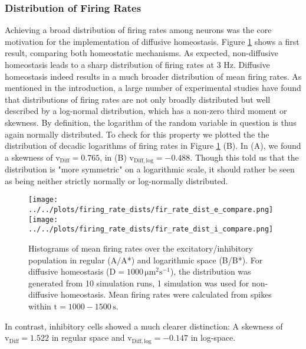 \documentclass[10pt,a4paper]{article}
\begin{document}
\subsubsection{Distribution of Firing Rates}\label{Fir_Dist_Section}
Achieving a broad distribution of firing rates among neurons was the core motivation for the implementation of diffusive homeostasis. Figure \ref{Fir_Rate_Dist_Compare} shows a first result, comparing both homeostatic mechanisms. As expected, non-diffusive homeostasis leads to a sharp distribution of firing rates at 3 Hz. Diffusive homeostasis indeed results in a much broader distribution of mean firing rates. As mentioned in the introduction, a large number of experimental studies have found that distributions of firing rates are not only broadly distributed but well described by a log-normal distribution, which has a non-zero third moment or skewness. By definition, the logarithm of the random variable in question is thus again normally distributed. To check for this property we plotted the the distribution of decadic logarithms of firing rates in Figure \ref{Fir_Rate_Dist_Compare} (B). In (A), we found a skewness of $\mathrm{v_{Diff} = 0.765}$, in (B) $\mathrm{v_{Diff,log} = -0.488}$. Though this told us that the distribution is "more symmetric" on a logarithmic scale, it should rather be seen as being neither strictly normally or log-normally distributed.  
\begin{figure}
\texttt{[image: ../../plots/firing\_rate\_dists/fir\_rate\_dist\_e\_compare.png]}
\texttt{[image: ../../plots/firing\_rate\_dists/fir\_rate\_dist\_i\_compare.png]}
\caption{Histograms of mean firing rates over the excitatory/inhibitory population in regular (A/A*) and logarithmic space (B/B*). For diffusive homeostasis ($\mathrm{D=1000\, \mu m^2 s^{-1}}$), the distribution was generated from 10 simulation runs, 1 simulation was used for non-diffusive homeostasis. Mean firing rates were calculated from spikes within $\mathrm{t=1000-1500\,s}$.}
\label{Fir_Rate_Dist_Compare}
\end{figure}
In contrast, inhibitory cells showed a much clearer distinction: A skewness of $\mathrm{v_{Diff} = 1.522}$ in regular space and $\mathrm{v_{Diff,log} = -0.147}$ in log-space.
\end{document}
